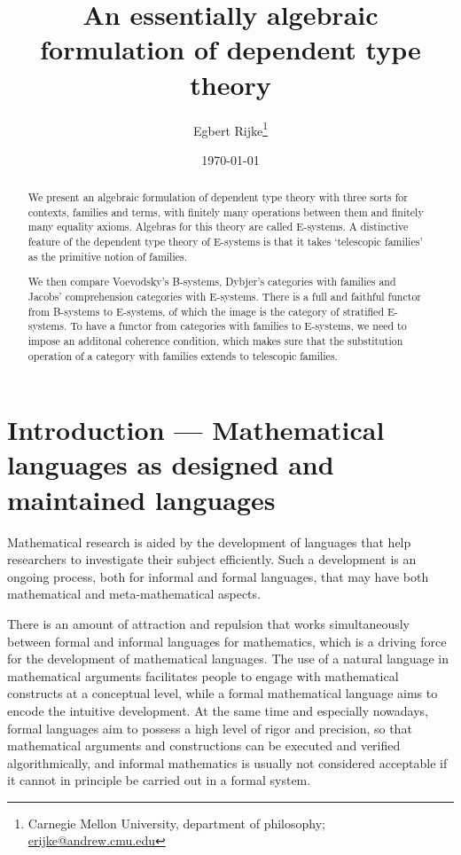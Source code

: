 \documentclass{article}
\title{An essentially algebraic formulation of dependent type theory}
\author{Egbert Rijke\footnote{{\sc Carnegie Mellon University}, department of
philosophy; \url{erijke@andrew.cmu.edu}}}
\date{\today}
\begin{document}
\maketitle

\begin{abstract}
We present an algebraic formulation of dependent type theory with
three sorts for contexts, families and terms, with finitely many operations
between them and finitely many equality axioms. Algebras for this theory are
called E-systems. A distinctive feature of the dependent type theory of
E-systems is that it takes `telescopic families' as the primitive notion of
families.

We then compare Voevodsky's B-systems, Dybjer's categories
with families and Jacobs' comprehension categories with E-systems. There is
a full and faithful functor from B-systems to E-systems, of which the image is
the category of stratified E-systems. To have a functor from categories with
families to E-systems, we need to impose an additonal coherence condition, which
makes sure that the substitution operation of a category with families extends 
to telescopic families. 
\end{abstract}


\section{Introduction --- Mathematical languages as designed and maintained languages}
Mathematical research is aided by the development of languages that help 
researchers to investigate their subject efficiently. Such a development is an
ongoing process, both for informal and formal languages, that may have both
mathematical and meta-mathematical aspects. 

There is an amount of attraction and repulsion that works simultaneously
between formal and informal languages for mathematics, which is a driving force
for the development of mathematical languages. The use of
a natural language in mathematical arguments facilitates people to engage
with mathematical constructs at a conceptual level, while a formal mathematical
language aims to encode the intuitive development. At the same time and 
especially nowadays, formal languages aim to possess a high level of rigor and
precision, so that mathematical arguments and constructions can be executed and
verified algorithmically, and informal mathematics is usually not considered
acceptable if it cannot in principle be carried out in a formal system.
\end{document}
